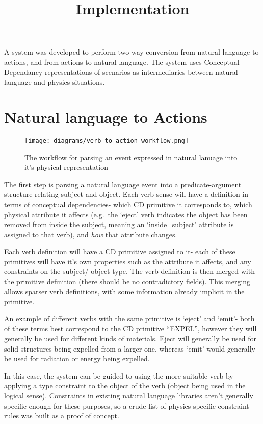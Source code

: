 \documentclass{article}
\title{Implementation}
\begin{document}
    \maketitle

    A system was developed to perform two way conversion from natural language to actions, and from actions to natural language. The system uses Conceptual Dependancy representations of scenarios as intermediaries between natural language and physics situations.

    \section{Natural language to Actions}
    \begin{figure}[h]
        \begin{center}
            \texttt{[image: diagrams/verb-to-action-workflow.png]}
        \end{center}
        \caption{The workflow for parsing an event expressed in natural lanuage into it's physical representation}
    \end{figure}

    The first step is parsing a natural language event into a predicate-argument structure relating subject and object. Each verb sense will have a definition in terms of conceptual dependencies- which CD primitive it corresponds to, which physical attribute it affects (e.g.~the `eject' verb indicates the object has been removed from inside the subject, meaning an `inside\_subject' attribute is assigned to that verb), and \emph{how} that attribute changes.

    Each verb definition will have a CD primitive assigned to it- each of these primitives will have it's own properties such as the attribute it affects, and any constraints on the subject/ object type. The verb definition is then merged with the primitive definition (there should be no contradictory fields). This merging allows sparser verb definitions, with some information already implicit in the primitive.

    An example of different verbs with the same primitive is `eject' and `emit'- both of these terms best correspond to the CD primitive ``EXPEL'', however they will generally be used for different kinds of materials. Eject will generally be used for solid structures being expelled from a larger one, whereas `emit' would generally be used for radiation or energy being expelled.

    In this case, the system can be guided to using the more suitable verb by applying a type constraint to the object of the verb (object being used in the logical sense). Constraints in existing natural language libraries aren't generally specific enough for these purposes, so a crude list of physics-specific constraint rules was built as a proof of concept.
    
\end{document}

